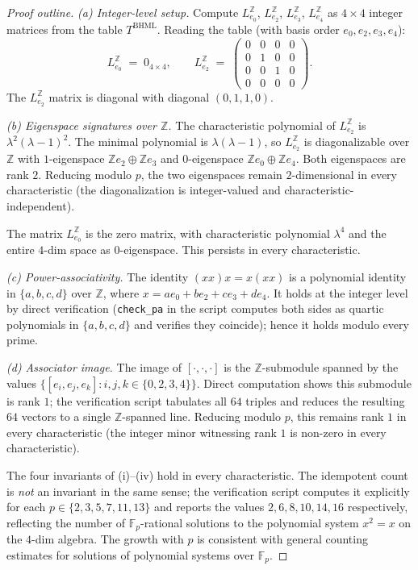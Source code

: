 \documentclass[11pt,reqno]{amsart}
\theoremstyle{plain}
\theoremstyle{definition}
\theoremstyle{remark}
\newcommand{\Z}{\mathbb{Z}}
\newcommand{\F}{\mathbb{F}}
\newcommand{\BHML}{\mathrm{BHML}}
\begin{document}
\begin{proof}[Proof outline]
\textit{(a) Integer-level setup.} Compute $L_{e_{0}}^{\Z}$,
$L_{e_{2}}^{\Z}$, $L_{e_{3}}^{\Z}$, $L_{e_{4}}^{\Z}$ as $4 \times 4$
integer matrices from the table $T^{\BHML}$. Reading the table (with
basis order $e_{0}, e_{2}, e_{3}, e_{4}$):
\[
L_{e_{0}}^{\Z} \;=\; 0_{4\times 4}, \qquad
L_{e_{2}}^{\Z} \;=\;
\begin{pmatrix}
0 & 0 & 0 & 0 \\
0 & 1 & 0 & 0 \\
0 & 0 & 1 & 0 \\
0 & 0 & 0 & 0
\end{pmatrix}.
\]
The $L_{e_{2}}^{\Z}$ matrix is diagonal with diagonal $(0, 1, 1, 0)$.

\textit{(b) Eigenspace signatures over $\Z$.}
The characteristic polynomial of $L_{e_{2}}^{\Z}$ is $\lambda^{2}
(\lambda - 1)^{2}$. The minimal polynomial is $\lambda(\lambda - 1)$,
so $L_{e_{2}}^{\Z}$ is diagonalizable over $\Z$ with $1$-eigenspace
$\Z e_{2} \oplus \Z e_{3}$ and $0$-eigenspace $\Z e_{0} \oplus \Z e_{4}$.
Both eigenspaces are rank $2$. Reducing modulo $p$, the two
eigenspaces remain $2$-dimensional in every characteristic (the
diagonalization is integer-valued and characteristic-independent).

The matrix $L_{e_{0}}^{\Z}$ is the zero matrix, with characteristic
polynomial $\lambda^{4}$ and the entire $4$-dim space as
$0$-eigenspace. This persists in every characteristic.

\textit{(c) Power-associativity.} The identity $(x x) x = x (x x)$
is a polynomial identity in $\{a, b, c, d\}$ over $\Z$, where $x = a
e_{0} + b e_{2} + c e_{3} + d e_{4}$. It holds at the integer level
by direct verification (\texttt{check\_pa} in the script computes both
sides as quartic polynomials in $\{a, b, c, d\}$ and verifies they
coincide); hence it holds modulo every prime.

\textit{(d) Associator image.} The image of $[\cdot, \cdot, \cdot]$
is the $\Z$-submodule spanned by the values $\{[e_{i}, e_{j},
e_{k}] : i, j, k \in \{0, 2, 3, 4\}\}$. Direct computation shows
this submodule is rank $1$; the verification script tabulates all
$64$ triples and reduces the resulting $64$ vectors to a single
$\Z$-spanned line. Reducing modulo $p$, this remains rank $1$ in
every characteristic (the integer minor witnessing rank $1$ is
non-zero in every characteristic).

\smallskip
The four invariants of (i)--(iv) hold in every characteristic. The
idempotent count is \emph{not} an invariant in the same sense; the
verification script computes it explicitly for each
$p \in \{2, 3, 5, 7, 11, 13\}$ and reports the values
$2, 6, 8, 10, 14, 16$ respectively, reflecting the number of
$\F_{p}$-rational solutions to the polynomial system $x^{2} = x$ on
the $4$-dim algebra. The growth with $p$ is consistent with general
counting estimates for solutions of polynomial systems over $\F_{p}$.
\end{proof}
\end{document}
